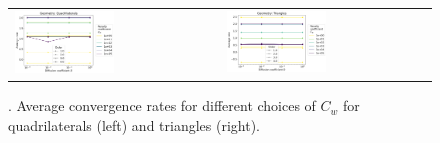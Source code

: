 \begin{figure}[h!]
	\centering
	\begin{tabular}{p{} p{}}
		\vspace{0pt}
        \includegraphics[width=0.5\textwidth]{../figs/parametric/diffusion_2D/ord_laplace_2_4}
		&
		\vspace{0pt}
        \includegraphics[width=0.5\textwidth]{../figs/parametric/diffusion_2D/ord_laplace_2_3}
	\end{tabular}
	\caption{. Average convergence rates for different choices of $C_w$
	for quadrilaterals (left) and triangles (right).}
	\label{fig:orders_lapalce}
\end{figure}


